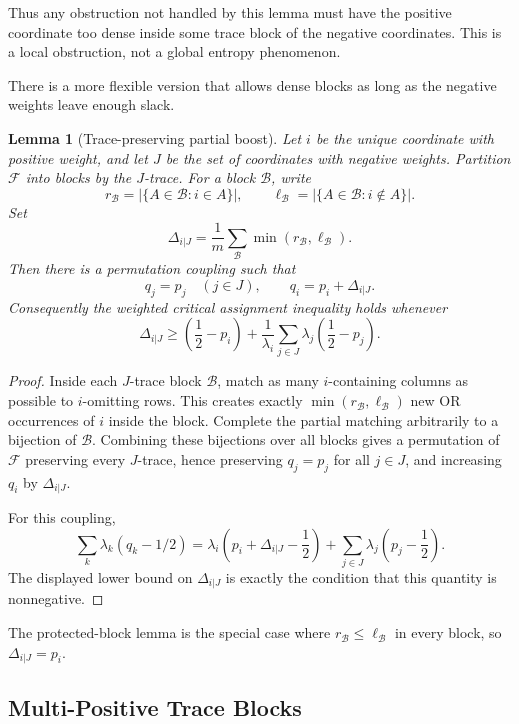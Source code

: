 \documentclass[11pt]{article}
\newtheorem{lemma}{Lemma}
\begin{document}
Thus any obstruction not handled by this lemma must have the positive
coordinate too dense inside some trace block of the negative coordinates.
This is a local obstruction, not a global entropy phenomenon.

There is a more flexible version that allows dense blocks as long as the
negative weights leave enough slack.

\begin{lemma}[Trace-preserving partial boost]
Let $i$ be the unique coordinate with positive weight, and let
$J$ be the set of coordinates with negative weights.  Partition
$\mathcal{F}$ into blocks by the $J$-trace.  For a block $\mathcal{B}$, write
\[
  r_{\mathcal{B}}=|\{A\in\mathcal{B}:i\in A\}|,
  \qquad
  \ell_{\mathcal{B}}=|\{A\in\mathcal{B}:i\notin A\}|.
\]
Set
\[
  \Delta_{i|J}
  =
  \frac1m\sum_{\mathcal{B}}\min(r_{\mathcal{B}},\ell_{\mathcal{B}}).
\]
Then there is a permutation coupling such that
\[
  q_j=p_j\quad(j\in J),
  \qquad
  q_i=p_i+\Delta_{i|J}.
\]
Consequently the weighted critical assignment inequality holds whenever
\[
  \Delta_{i|J}
  \geq
  \left(\frac12-p_i\right)
  +
  \frac1{\lambda_i}\sum_{j\in J}\lambda_j\left(\frac12-p_j\right).
\]
\end{lemma}

\begin{proof}
Inside each $J$-trace block $\mathcal{B}$, match as many $i$-containing
columns as possible to $i$-omitting rows.  This creates exactly
$\min(r_{\mathcal{B}},\ell_{\mathcal{B}})$ new OR occurrences of $i$ inside
the block.  Complete the partial matching arbitrarily to a bijection of
$\mathcal{B}$.  Combining these bijections over all blocks gives a
permutation of $\mathcal{F}$ preserving every $J$-trace, hence preserving
$q_j=p_j$ for all $j\in J$, and increasing $q_i$ by $\Delta_{i|J}$.

For this coupling,
\[
  \sum_k\lambda_k(q_k-1/2)
  =
  \lambda_i\left(p_i+\Delta_{i|J}-\frac12\right)
  +
  \sum_{j\in J}\lambda_j\left(p_j-\frac12\right).
\]
The displayed lower bound on $\Delta_{i|J}$ is exactly the condition that
this quantity is nonnegative.
\end{proof}

The protected-block lemma is the special case where
$r_{\mathcal{B}}\leq \ell_{\mathcal{B}}$ in every block, so
$\Delta_{i|J}=p_i$.

\subsection{Multi-Positive Trace Blocks}
\end{document}
